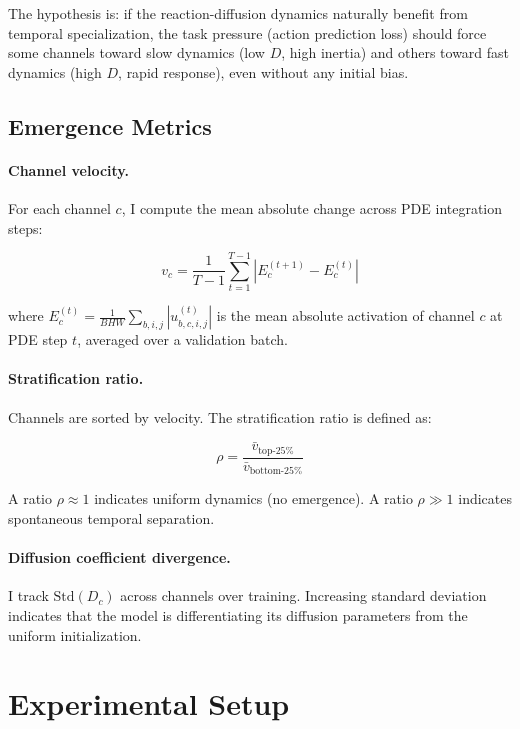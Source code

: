 \documentclass{article}
\begin{document}
The hypothesis is: if the reaction-diffusion dynamics naturally benefit from temporal specialization, the task pressure (action prediction loss) should force some channels toward slow dynamics (low $D$, high inertia) and others toward fast dynamics (high $D$, rapid response), even without any initial bias.

\subsection{Emergence Metrics}

\paragraph{Channel velocity.} For each channel $c$, I compute the mean absolute change across PDE integration steps:

\begin{equation}
v_c = \frac{1}{T-1} \sum_{t=1}^{T-1} \left| E_c^{(t+1)} - E_c^{(t)} \right|
\end{equation}

where $E_c^{(t)} = \frac{1}{BHW} \sum_{b,i,j} |u_{b,c,i,j}^{(t)}|$ is the mean absolute activation of channel $c$ at PDE step $t$, averaged over a validation batch.

\paragraph{Stratification ratio.} Channels are sorted by velocity. The stratification ratio is defined as:

\begin{equation}
\rho = \frac{\bar{v}_{\text{top-25\%}}}{\bar{v}_{\text{bottom-25\%}}}
\end{equation}

A ratio $\rho \approx 1$ indicates uniform dynamics (no emergence). A ratio $\rho \gg 1$ indicates spontaneous temporal separation.

\paragraph{Diffusion coefficient divergence.} I track $\text{Std}(D_c)$ across channels over training. Increasing standard deviation indicates that the model is differentiating its diffusion parameters from the uniform initialization.

\section{Experimental Setup}
\label{sec:setup}
\end{document}
